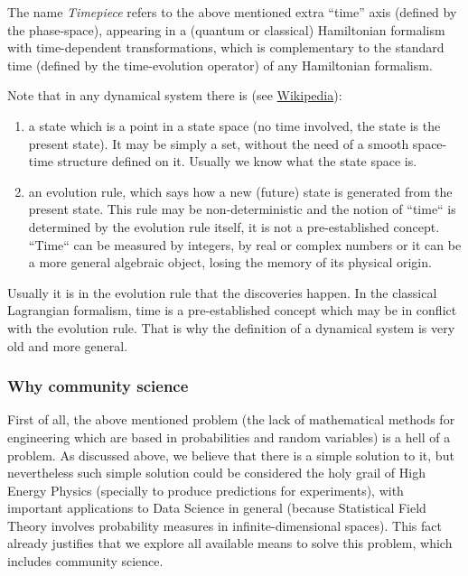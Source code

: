 \documentclass[11pt]{book}
\begin{document}
The name \emph{Timepiece} refers to the above mentioned extra ``time''
axis (defined by the phase-space), appearing in a (quantum or classical)
Hamiltonian formalism with time-dependent transformations, which is
complementary to the standard time (defined by the time-evolution
operator) of any Hamiltonian formalism.

Note that in any dynamical system there is (see
\href{https://en.wikipedia.org/wiki/Dynamical_system_(definition)}{Wikipedia}):

\begin{enumerate}
\item
  a state which is a point in a state space (no time involved, the state
  is the present state). It may be simply a set, without the need of a
  smooth space-time structure defined on it. Usually we know what the
  state space is.
\item
  an evolution rule, which says how a new (future) state is generated
  from the present state. This rule may be non-deterministic and the
  notion of ``time\textquotesingle`` is determined by the evolution rule
  itself, it is not a pre-established concept. ``Time\textquotesingle``
  can be measured by integers, by real or complex numbers or it can be a
  more general algebraic object, losing the memory of its physical
  origin.
\end{enumerate}

Usually it is in the evolution rule that the discoveries happen. In the
classical Lagrangian formalism, time is a pre-established concept which
may be in conflict with the evolution rule. That is why the definition
of a dynamical system is very old and more general.

\hypertarget{why-community-science}{%
\subsubsection{Why community science}\label{why-community-science}}

First of all, the above mentioned problem (the lack of mathematical
methods for engineering which are based in probabilities and random
variables) is a hell of a problem. As discussed above, we believe that
there is a simple solution to it, but nevertheless such simple solution
could be considered the holy grail of High Energy Physics (specially to
produce predictions for experiments), with important applications to
Data Science in general (because Statistical Field Theory involves
probability measures in infinite-dimensional spaces). This fact already
justifies that we explore all available means to solve this problem,
which includes community science.
\end{document}
